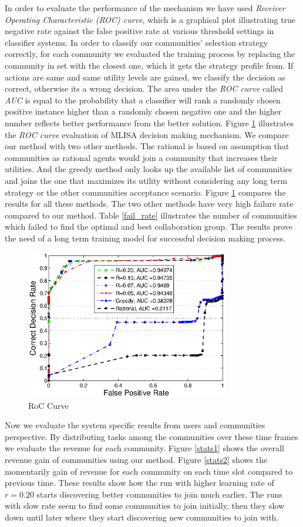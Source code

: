 \documentclass[10pt,journal,cspaper,compsoc]{IEEEtran}
\begin{document}
In order to evaluate the performance of the mechanism we have used \emph{Receiver Operating Characteristic (ROC) curve}, which is a graphical plot illustrating true negative rate against the false positive rate at various threshold settings in classifier systems. In order to classify our communities' selection strategy correctly, for each community we evaluated the training process by replacing the community in set with the closest one, which it gets the strategy profile from. If actions are same and same utility levels are gained, we classify the decision as correct, otherwise its a wrong decision. The area under the \emph{ROC curve} called \emph{AUC} is equal to the probability that a classifier will rank a randomly chosen positive instance higher than a randomly chosen negative one\cite{xxx} and the higher number reflects better performance from the better solution.  Figure \ref{roc5} illustrates the \emph{ROC curve} evaluation of MLISA decision making mechanism. We compare our method with two other methods. The rational is based on assumption that communities as rational agents would join a community that increases their utilities. And the greedy method only looks up the available list of communities and joins the one that maximizes its utility without considering any long term strategy or the other communities acceptance scenario. Figure \ref{roc5} compares the results for all these methods. The two other methods have very high failure rate compared to our method. Table \ref{fail_rate} illustrates the number of communities which failed to find the optimal and best collaboration group. The results prove the need of a long term training model for successful decision making process.

\begin{figure}%
\centering
\includegraphics[width=3.5in]{figures/roc.eps}
\caption{RoC Curve}
\label{roc5}
\end{figure}
Now we evaluate the system specific results from users and communities perspective. By distributing tasks among the communities over these time frames we evaluate the revenue for each community. Figure \ref{stats1} shows the overall revenue gain of communities using our method. Figure \ref{stats2} shows the momentarily gain of revenue for each community on each time slot compared to previous time. These results show how the run with higher learning rate of $r=0.20$ starts discovering better communities to join much earlier. The runs with slow rate seem to find some communities to join initially, then they slow down until later where they start discovering new communities to join with.
\end{document}
